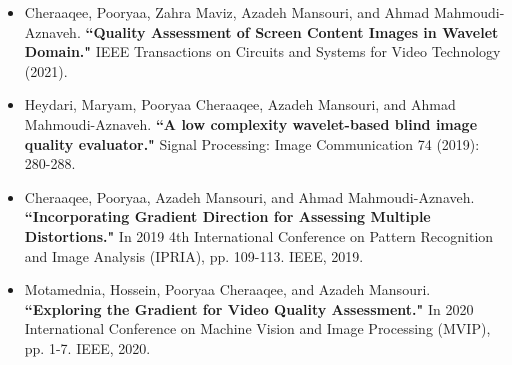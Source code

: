 \documentclass[10pt,a4paper]{altacv}
\begin{document}
\begin{itemize}
		\item Cheraaqee, Pooryaa, Zahra Maviz, Azadeh Mansouri, and Ahmad Mahmoudi-Aznaveh. \textbf{``Quality Assessment of Screen Content Images in Wavelet Domain."} IEEE Transactions on Circuits and Systems for Video Technology (2021).

		\item Heydari, Maryam, Pooryaa Cheraaqee, Azadeh Mansouri, and Ahmad Mahmoudi-Aznaveh. \textbf{``A low complexity wavelet-based blind image quality evaluator."} Signal Processing: Image Communication 74 (2019): 280-288.

		\item Cheraaqee, Pooryaa, Azadeh Mansouri, and Ahmad Mahmoudi-Aznaveh. \textbf{``Incorporating Gradient Direction for Assessing Multiple Distortions."} In 2019 4th International Conference on Pattern Recognition and Image Analysis (IPRIA), pp. 109-113. IEEE, 2019.

		\item Motamednia, Hossein, Pooryaa Cheraaqee, and Azadeh Mansouri. \textbf{``Exploring the Gradient for Video Quality Assessment."} In 2020 International Conference on Machine Vision and Image Processing (MVIP), pp. 1-7. IEEE, 2020.

  
  \end{itemize}

\clearpage
\end{document}
